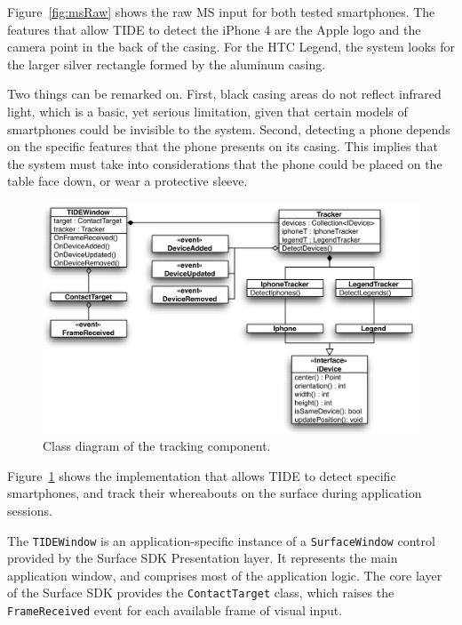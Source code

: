 Figure~\ref{fig:msRaw} shows the raw MS input for both tested smartphones.
The features that allow TIDE to detect the iPhone 4 are the Apple logo and the camera point in the back of the casing.
For the HTC Legend, the system looks for the larger silver rectangle formed by the aluminum casing.

Two things can be remarked on.
First, black casing areas do not reflect infrared light, which is a basic, yet serious limitation, given that certain models of smartphones could be invisible to the system.
Second, detecting a phone depends on the specific features that the phone presents on its casing.
This implies that the system must take into considerations that the phone could be placed on the table face down, or wear a protective sleeve.

\begin{figure}[htbp]
  \centering
    \includegraphics[width=1\textwidth]{images/trackingDiagram}
    \caption{Class diagram of the tracking component.}
    \label{fig:trackingDiagram}
\end{figure}

Figure~\ref{fig:trackingDiagram} shows the implementation that allows TIDE to detect specific smartphones, and track their whereabouts on the surface during application sessions.

The \texttt{TIDEWindow} is an application-specific instance of a \texttt{SurfaceWindow} control provided by the Surface SDK Presentation layer. 
It represents the main application window, and comprises most of the application logic.
The core layer of the Surface SDK provides the \texttt{ContactTarget} class, which raises the \texttt{FrameReceived} event for each available frame of visual input.

